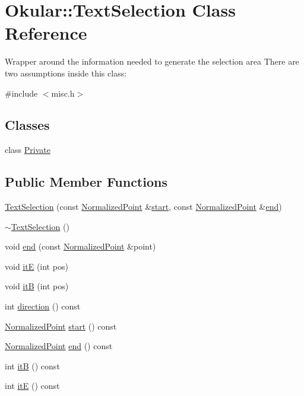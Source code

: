 \hypertarget{classOkular_1_1TextSelection}{\section{Okular\+:\+:Text\+Selection Class Reference}
\label{classOkular_1_1TextSelection}
}


Wrapper around the information needed to generate the selection area There are two assumptions inside this class\+:  




{\ttfamily \#include $<$misc.\+h$>$}

\subsection*{Classes}
\begin{DoxyCompactItemize}
\item 
class \hyperlink{classTextSelection_1_1Private}{Private}
\end{DoxyCompactItemize}
\subsection*{Public Member Functions}
\begin{DoxyCompactItemize}
\item 
\hyperlink{classOkular_1_1TextSelection_ace1428a15bd991b7b0e106a75f6577a6}{Text\+Selection} (const \hyperlink{classOkular_1_1NormalizedPoint}{Normalized\+Point} \&\hyperlink{classOkular_1_1TextSelection_a267da63c1d52368f7289d4c84bff979e}{start}, const \hyperlink{classOkular_1_1NormalizedPoint}{Normalized\+Point} \&\hyperlink{classOkular_1_1TextSelection_a8bb728b7561aaedc7b22c073ca382539}{end})
\item 
\hyperlink{classOkular_1_1TextSelection_a3ff2aa22f47a11b6adbfe56d9a4001f1}{$\sim$\+Text\+Selection} ()
\item 
void \hyperlink{classOkular_1_1TextSelection_a8bb728b7561aaedc7b22c073ca382539}{end} (const \hyperlink{classOkular_1_1NormalizedPoint}{Normalized\+Point} \&point)
\item 
void \hyperlink{classOkular_1_1TextSelection_ad08b6ea009ecb7b66ec749a45456eea4}{it\+E} (int pos)
\item 
void \hyperlink{classOkular_1_1TextSelection_ac5e0850038239d3a053071965fa7733b}{it\+B} (int pos)
\item 
int \hyperlink{classOkular_1_1TextSelection_af41e7724bdf0d455205ae2c4d5378751}{direction} () const 
\item 
\hyperlink{classOkular_1_1NormalizedPoint}{Normalized\+Point} \hyperlink{classOkular_1_1TextSelection_a267da63c1d52368f7289d4c84bff979e}{start} () const 
\item 
\hyperlink{classOkular_1_1NormalizedPoint}{Normalized\+Point} \hyperlink{classOkular_1_1TextSelection_a8f0bfdceca5f9b8f93d0c95649d588aa}{end} () const 
\item 
int \hyperlink{classOkular_1_1TextSelection_a57fd041a05a30ea82da4cca2803a6794}{it\+B} () const 
\item 
int \hyperlink{classOkular_1_1TextSelection_ae4c699cffc468e7ff6fc4ec714e97fba}{it\+E} () const 
\end{DoxyCompactItemize}


